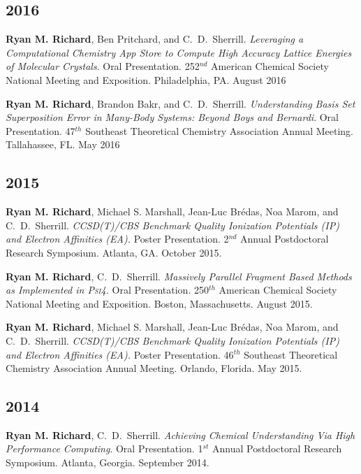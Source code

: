 \documentclass[11pt,a4paper,sans]{moderncv}
\begin{document}
\begin{etaremune}
	\subsection{2016}
	\item{\textbf{Ryan M. Richard}, Ben Pritchard, and C.~D.~Sherrill. 
	      \textit{Leveraging a Computational Chemistry App Store to Compute 
		  High Accuracy Lattice Energies of Molecular Crystals}.  Oral 
		  Presentation.  252$^{nd}$ American Chemical Society National Meeting 
		  and Exposition.  Philadelphia, PA. August 2016}
	\item{\textbf{Ryan M. Richard}, Brandon Bakr, and C.~D.~Sherrill.
	      \textit{Understanding Basis Set Superposition Error in Many-Body 
		  Systems: Beyond Boys and Bernardi}.  Oral Presentation.  47$^{th}$  
		  Southeast Theoretical Chemistry Association Annual Meeting.  
		  Tallahassee, FL. May 2016}

	\subsection{2015}
	\item{\textbf{Ryan M. Richard}, Michael S. Marshall, Jean-Luc Br{\' e}das, 
	      Noa Marom, and C.~D.~Sherrill. {\em CCSD(T)/CBS Benchmark Quality 
		  Ionization Potentials (IP) and Electron Affinities (EA).} Poster 
		  Presentation.  2$^{nd}$ Annual Postdoctoral Research Symposium.  
		  Atlanta, GA. October 2015.}
	\item{\textbf{Ryan M. Richard}, C.~D.~Sherrill.  {\em Massively Parallel 
	      Fragment Based Methods as Implemented in \textsc{Psi4}.} Oral 
		  Presentation.  250$^{th}$ American Chemical Society National Meeting
		  and Exposition. Boston, Massachusetts. August 2015.}
	\item{\textbf{Ryan M. Richard}, Michael S. Marshall, Jean-Luc Br{\' e}das, 
	      Noa Marom, and C.~D.~Sherrill. {\em CCSD(T)/CBS Benchmark Quality 
		  Ionization Potentials (IP) and Electron Affinities (EA).} Poster 
		  Presentation.  46$^{th}$ Southeast Theoretical Chemistry Association
		  Annual Meeting.  Orlando, Florida. May 2015.}

	\subsection{2014}
	\item{\textbf{Ryan M. Richard}, C.~D.~Sherrill. {\em Achieving Chemical 
	      Understanding Via High Performance Computing}. Oral Presentation. 
		  1$^{st}$ Annual Postdoctoral Research Symposium.  Atlanta, Georgia.  
		  September 2014.}


\end{etaremune}
\end{document}
